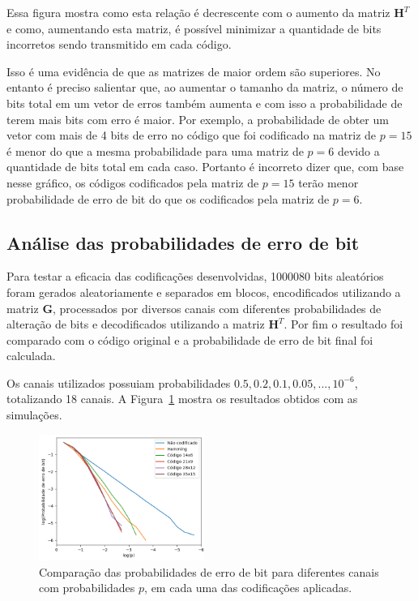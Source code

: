 Essa figura mostra como esta relação é decrescente com o aumento da matriz $\textbf{H}^T$ e como, aumentando esta matriz, é possível minimizar a quantidade de bits incorretos sendo transmitido em cada código.

Isso é uma evidência de que as matrizes de maior ordem são superiores. No entanto é preciso salientar que, ao aumentar o tamanho da matriz, o número de bits total em um vetor de erros também aumenta e com isso a probabilidade de terem mais bits com erro é maior. Por exemplo, a probabilidade de obter um vetor com mais de 4 bits de erro no código que foi codificado na matriz de $p = 15$ é menor do que a mesma probabilidade para uma matriz de $p = 6$ devido a quantidade de bits total em cada caso. Portanto é incorreto dizer que, com base nesse gráfico, os códigos codificados pela matriz de $p = 15$ terão menor probabilidade de erro de bit do que os codificados pela matriz de $p = 6$.

\subsection{Análise das probabilidades de erro de bit}

Para testar a eficacia das codificações desenvolvidas, 1000080 bits aleatórios foram gerados aleatoriamente e separados em blocos, encodificados utilizando a matriz $\textbf{G}$, processados por diversos canais com diferentes probabilidades de alteração de bits e decodificados utilizando a matriz $\textbf{H}^T$. Por fim o resultado foi comparado com o código original e a probabilidade de erro de bit final foi calculada. 

Os canais utilizados possuiam probabilidades $0.5, 0.2, 0.1, 0.05, ..., 10^{-6}$, totalizando 18 canais. A Figura~\ref{fig:bit_error_probabilities} mostra os resultados obtidos com as simulações.

\begin{figure}[thpb]
  \centering
  \includegraphics[width=0.48\textwidth]{sections/bit_error_probabilities.png}
  \caption{Comparação das probabilidades de erro de bit para diferentes canais com probabilidades $p$, em cada uma das codificações aplicadas.}
  \label{fig:bit_error_probabilities}
\end{figure}


